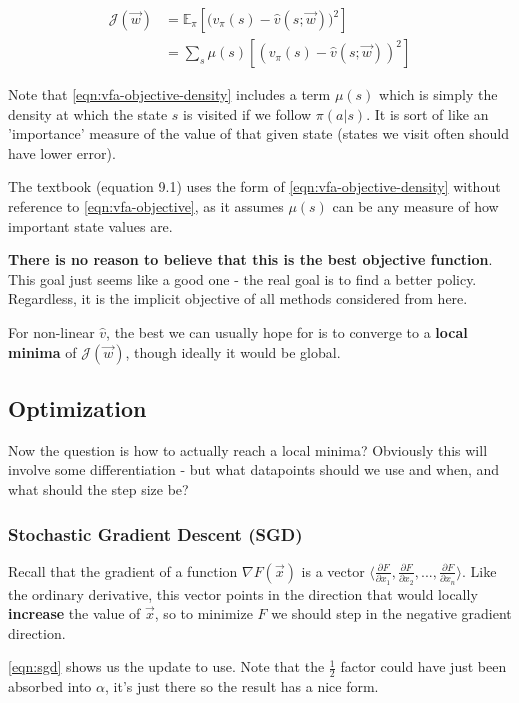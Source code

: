 \documentclass[11pt]{report}
\begin{document}
\begin{align}
	\label{eqn:vfa-objective}
	\mathcal{J}(\vec{w}) &= \mathbb{E}_\pi\left[\bigg(v_\pi(s) - \hat{v}(s;\vec{w})\bigg)^2\right]\\
		\label{eqn:vfa-objective-density}
		&= \sum_s \mu(s) \left[\left(v_\pi(s) - \hat{v}(s;\vec{w})\right)^2\right]
\end{align}

Note that \autoref{eqn:vfa-objective-density} includes a term $\mu(s)$ which is simply the density at which the state $s$ is visited if we follow $\pi(a | s)$. It is sort of like an 'importance' measure of the value of that given state (states we visit often should have lower error).

The textbook (equation 9.1) uses the form of \autoref{eqn:vfa-objective-density} without reference to \autoref{eqn:vfa-objective}, as it assumes $\mu(s)$ can be any measure of how important state values are.

\textbf{There is no reason to believe that this is the best objective function}. This goal just seems like a good one - the real goal is to find a better policy. Regardless, it is the implicit objective of all methods considered from here.

For non-linear $\hat{v}$, the best we can usually hope for is to converge to a \textbf{local minima} of $\mathcal{J}(\vec{w})$, though ideally it would be global.

\subsection{Optimization}
Now the question is how to actually reach a local minima? Obviously this will involve some differentiation - but what datapoints should we use and when, and what should the step size be?

\subsubsection{Stochastic Gradient Descent (SGD)}
Recall that the gradient of a function $\nabla F(\vec{x})$ is a vector $\langle \frac{\partial F}{\partial x_1}, \frac{\partial F}{\partial x_2}, ..., \frac{\partial F}{\partial x_n}\rangle$. Like the ordinary derivative, this vector points in the direction that would locally \textbf{increase} the value of $\vec{x}$, so to minimize $F$ we should step in the negative gradient direction.

\autoref{eqn:sgd} shows us the update to use. Note that the $\frac{1}{2}$ factor could have just been absorbed into $\alpha$, it's just there so the result has a nice form.
\end{document}
